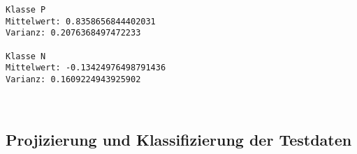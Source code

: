 \documentclass[11pt]{article}
\begin{document}
    \begin{Verbatim}[commandchars=\\\{\}]
Klasse P
Mittelwert: 0.8358656844402031
Varianz: 0.2076368497472233

Klasse N
Mittelwert: -0.13424976498791436
Varianz: 0.1609224943925902

    \end{Verbatim}

    \begin{center}
    \end{center}
    { \hspace*{\fill} \\}
    
    \subsection{Projizierung und Klassifizierung der
Testdaten}\label{projizierung-und-klassifizierung-der-testdaten}
\end{document}
